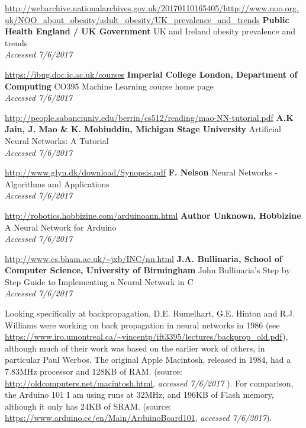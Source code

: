 \documentclass[a4paper]{article}
\begin{document}
\begin{thebibliography}{9}


\url{http://webarchive.nationalarchives.gov.uk/20170110165405/http://www.noo.org.uk/NOO_about_obesity/adult_obesity/UK_prevalence_and_trends}
\textbf{Public Health England / UK Government}
UK and Ireland obesity prevalence and trends
\\\textit{Accessed 7/6/2017}




\url{https://ibug.doc.ic.ac.uk/courses}
\textbf{Imperial College London, Department of Computing}
CO395 Machine Learning course home page
\\\textit{Accessed 7/6/2017}

\url{http://people.sabanciuniv.edu/berrin/cs512/reading/mao-NN-tutorial.pdf}
\textbf{A.K Jain, J. Mao \& K. Mohiuddin, Michigan Stage University}
Artificial Neural Networks: A Tutorial
\\\textit{Accessed 7/6/2017}

\url{http://www.glyn.dk/download/Synopsis.pdf}
\textbf{F. Nelson}
Neural Networks - Algorithms and Applications
\\\textit{Accessed 7/6/2017}

\url{http://robotics.hobbizine.com/arduinoann.html}
\textbf{Author Unknown, Hobbizine}
A Neural Network for Arduino
\\\textit{Accessed 7/6/2017}

\url{http://www.cs.bham.ac.uk/~jxb/INC/nn.html}
\textbf{J.A. Bullinaria, School of Computer Science, University of Birmingham}
John Bullinaria's Step by Step Guide to Implementing a Neural Network in C
\\\textit{Accessed 7/6/2017}

Looking specifically at backpropagation, D.E. Rumelhart, G.E. Hinton and R.J. Williams were working on back propagation in neural networks in 1986 (see \url{https://www.iro.umontreal.ca/~vincentp/ift3395/lectures/backprop_old.pdf}), although much of their work was based on the earlier work of others, in particular Paul Werbos. 
The original Apple Macintosh, released in 1984, had a 7.83MHz processor and 128KB of RAM. (source: \url{http://oldcomputers.net/macintosh.html}, \textit{accessed 7/6/2017}
). For comparison, the Arduino 101 I am using runs at 32MHz, and 196KB of Flash memory, although it only has 24KB of SRAM. (source: \url{https://www.arduino.cc/en/Main/ArduinoBoard101}, \textit{accessed 7/6/2017}).


\end{thebibliography}
\end{document}
